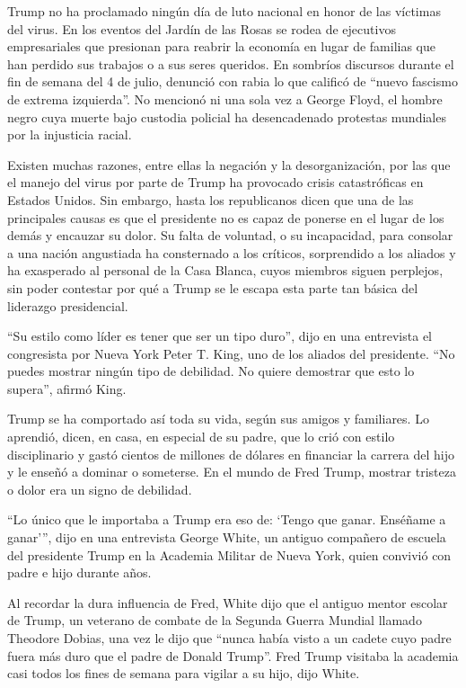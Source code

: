 Trump no ha proclamado ningún día de luto nacional en honor de las
víctimas del virus. En los eventos del Jardín de las Rosas se rodea de
ejecutivos empresariales que presionan para reabrir la economía en lugar
de familias que han perdido sus trabajos o a sus seres queridos. En
sombríos discursos durante el fin de semana del 4 de julio, denunció con
rabia lo que calificó de ``nuevo fascismo de extrema izquierda''. No
mencionó ni una sola vez a George Floyd, el hombre negro cuya muerte
bajo custodia policial ha desencadenado protestas mundiales por la
injusticia racial.

Existen muchas razones, entre ellas la negación y la desorganización,
por las que el manejo del virus por parte de Trump ha provocado crisis
catastróficas en Estados Unidos. Sin embargo, hasta los republicanos
dicen que una de las principales causas es que el presidente no es capaz
de ponerse en el lugar de los demás y encauzar su dolor. Su falta de
voluntad, o su incapacidad, para consolar a una nación angustiada ha
consternado a los críticos, sorprendido a los aliados y ha exasperado al
personal de la Casa Blanca, cuyos miembros siguen perplejos, sin poder
contestar por qué a Trump se le escapa esta parte tan básica del
liderazgo presidencial.

``Su estilo como líder es tener que ser un tipo duro'', dijo en una
entrevista el congresista por Nueva York Peter T. King, uno de los
aliados del presidente. ``No puedes mostrar ningún tipo de debilidad. No
quiere demostrar que esto lo supera'', afirmó King.

Trump se ha comportado así toda su vida, según sus amigos y familiares.
Lo aprendió, dicen, en casa, en especial de su padre, que lo crió con
estilo disciplinario y gastó cientos de millones de dólares en financiar
la carrera del hijo y le enseñó a dominar o someterse. En el mundo de
Fred Trump, mostrar tristeza o dolor era un signo de debilidad.

``Lo único que le importaba a Trump era eso de: `Tengo que ganar.
Enséñame a ganar''', dijo en una entrevista George White, un antiguo
compañero de escuela del presidente Trump en la Academia Militar de
Nueva York, quien convivió con padre e hijo durante años.

Al recordar la dura influencia de Fred, White dijo que el antiguo mentor
escolar de Trump, un veterano de combate de la Segunda Guerra Mundial
llamado Theodore Dobias, una vez le dijo que ``nunca había visto a un
cadete cuyo padre fuera más duro que el padre de Donald Trump''. Fred
Trump visitaba la academia casi todos los fines de semana para vigilar a
su hijo, dijo White.

